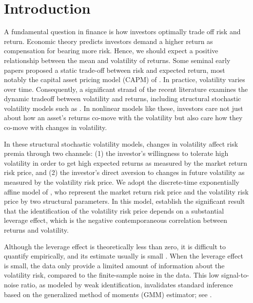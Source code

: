
\section{Introduction}

A fundamental question in finance is how investors optimally trade off risk and return. Economic theory predicts investors demand a higher return as compensation for bearing more risk. Hence, we should expect a positive relationship between the mean and volatility of returns. Some seminal early papers proposed a static trade-off between risk and expected return, most notably the capital asset pricing model (CAPM) of \textcites{sharpe1964capital,lintner1965security}. In practice, volatility varies over time. Consequently, a significant strand of the recent literature examines the dynamic tradeoff between volatility and returns, including structural stochastic volatility models  such as \textcites{christoffersen2013capturing, bansal2014volatility, dewbecker2017price}.  In nonlinear models like these, investors care not just about how an asset's returns co-move with the volatility but also care how they co-move with changes in volatility. 

In these structural stochastic volatility models, changes in volatility affect risk premia through two channels: (1) the investor's willingness to tolerate high volatility in order to get high expected returns as measured by the market return risk price, and (2) the investor’s direct aversion to changes in future volatility as measured by the volatility risk price. We adopt the discrete-time exponentially affine model of \textcite{han2018leverage}, who represent the market return risk price and the volatility risk price by two structural parameters. In this model,  \textcite{han2018leverage} establish the significant result that the identification of the volatility risk price depends on a substantial leverage effect, which is the negative contemporaneous correlation between returns and volatility. 

Although the leverage effect is theoretically less than zero, it is difficult to quantify empirically, and its estimate usually is small \parencites{aitsahalia2013leverage}. When the leverage effect is small, the data only provide a limited amount of information about the volatility risk, compared to the finite-sample noise in the data. This low signal-to-noise ratio,  as modeled by weak identification, invalidates standard inference based on the generalized method of moments (GMM) estimator; see \textcites{stock2000GMM,andrews2012estimation}.

